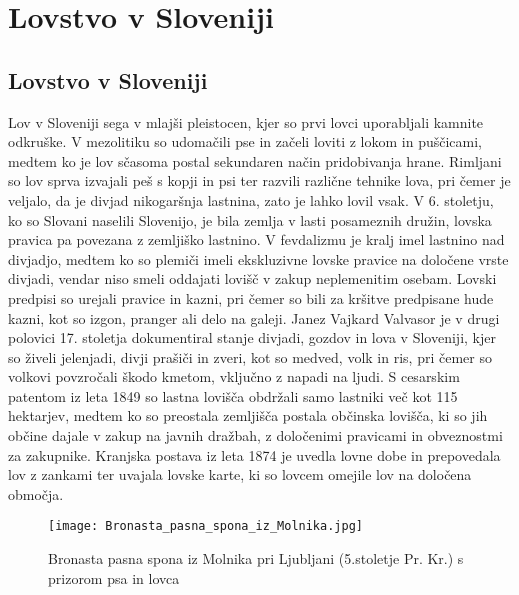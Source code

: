 \documentclass[a4paper,12pt,openright]{book}
\begin{document}
\chapter{Lovstvo v Sloveniji}
\label{zgodovina}

\section{Lovstvo v Sloveniji}

Lov v Sloveniji sega v mlajši pleistocen, kjer so prvi lovci uporabljali kamnite odkruške.
V mezolitiku so udomačili pse in začeli loviti z lokom in puščicami, medtem ko je lov sčasoma postal sekundaren način pridobivanja hrane.
Rimljani so lov sprva izvajali peš s kopji in psi ter razvili različne tehnike lova, pri čemer je veljalo, da je divjad nikogaršnja lastnina, zato je lahko lovil vsak.\cite{Lov_8_14}
V 6. stoletju, ko so Slovani naselili Slovenijo, je bila zemlja v lasti posameznih družin, lovska pravica pa povezana z zemljiško lastnino.
V fevdalizmu je kralj imel lastnino nad divjadjo, medtem ko so plemiči imeli ekskluzivne lovske pravice na določene vrste divjadi, vendar niso smeli oddajati lovišč v zakup neplemenitim osebam.
Lovski predpisi so urejali pravice in kazni, pri čemer so bili za kršitve predpisane hude kazni, kot so izgon, pranger ali delo na galeji.\cite{Lov_15_34}
Janez Vajkard Valvasor je v drugi polovici 17. stoletja dokumentiral stanje divjadi, gozdov in lova v Sloveniji, kjer so živeli jelenjadi, divji prašiči in zveri, kot so medved, volk in ris, pri čemer so volkovi povzročali škodo kmetom, vključno z napadi na ljudi. 
S cesarskim patentom iz leta 1849 so lastna lovišča obdržali samo lastniki več kot 115 hektarjev, medtem ko so preostala zemljišča postala občinska lovišča, ki so jih občine dajale v zakup na javnih dražbah, z določenimi pravicami in obveznostmi za zakupnike.
Kranjska postava iz leta 1874 je uvedla lovne dobe in prepovedala lov z zankami ter uvajala lovske karte, ki so lovcem omejile lov na določena območja.\cite{Lov_43_55}

\begin{figure}[h!]  
  \centering
  \texttt{[image: Bronasta\_pasna\_spona\_iz\_Molnika.jpg]}  %
  \caption{Bronasta pasna spona iz Molnika pri Ljubljani (5.stoletje Pr. Kr.) s prizorom psa in lovca \cite{pasna_spona_vir}}
  \label{fig:bronasta_pasna_spona}
\end{figure}
\end{document}

